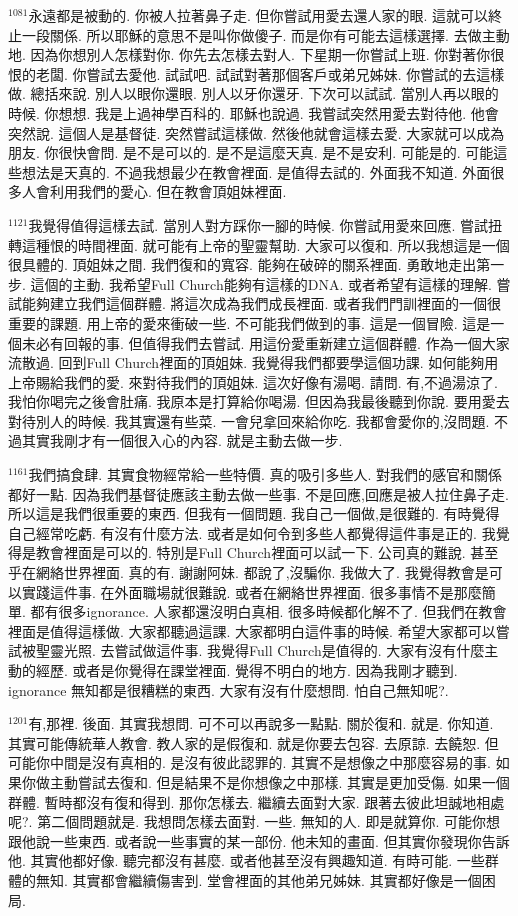 \documentclass{book}
\begin{document}
$^{1081}$永遠都是被動的.
你被人拉著鼻子走.
但你嘗試用愛去還人家的眼.
這就可以終止一段關係.
所以耶穌的意思不是叫你做傻子.
而是你有可能去這樣選擇.
去做主動地.
因為你想別人怎樣對你.
你先去怎樣去對人.
下星期一你嘗試上班.
你對著你很恨的老闆.
你嘗試去愛他.
試試吧.
試試對著那個客戶或弟兄姊妹.
你嘗試的去這樣做.
總括來說.
別人以眼你還眼.
別人以牙你還牙.
下次可以試試.
當別人再以眼的時候.
你想想.
我是上過神學百科的.
耶穌也說過.
我嘗試突然用愛去對待他.
他會突然說.
這個人是基督徒.
突然嘗試這樣做.
然後他就會這樣去愛.
大家就可以成為朋友.
你很快會問.
是不是可以的.
是不是這麼天真.
是不是安利.
可能是的.
可能這些想法是天真的.
不過我想最少在教會裡面.
是值得去試的.
外面我不知道.
外面很多人會利用我們的愛心.
但在教會頂姐妹裡面.

$^{1121}$我覺得值得這樣去試.
當別人對方踩你一腳的時候.
你嘗試用愛來回應.
嘗試扭轉這種恨的時間裡面.
就可能有上帝的聖靈幫助.
大家可以復和.
所以我想這是一個很具體的.
頂姐妹之間.
我們復和的寬容.
能夠在破碎的關系裡面.
勇敢地走出第一步.
這個的主動.
我希望Full Church能夠有這樣的DNA.
或者希望有這樣的理解.
嘗試能夠建立我們這個群體.
將這次成為我們成長裡面.
或者我們門訓裡面的一個很重要的課題.
用上帝的愛來衝破一些.
不可能我們做到的事.
這是一個冒險.
這是一個未必有回報的事.
但值得我們去嘗試.
用這份愛重新建立這個群體.
作為一個大家流散過.
回到Full Church裡面的頂姐妹.
我覺得我們都要學這個功課.
如何能夠用上帝賜給我們的愛.
來對待我們的頂姐妹.
這次好像有湯喝.
請問.
有,不過湯涼了.
我怕你喝完之後會肚痛.
我原本是打算給你喝湯.
但因為我最後聽到你說.
要用愛去對待別人的時候.
我其實還有些菜.
一會兒拿回來給你吃.
我都會愛你的,沒問題.
不過其實我剛才有一個很入心的內容.
就是主動去做一步.

$^{1161}$我們搞食肆.
其實食物經常給一些特價.
真的吸引多些人.
對我們的感官和關係都好一點.
因為我們基督徒應該主動去做一些事.
不是回應,回應是被人拉住鼻子走.
所以這是我們很重要的東西.
但我有一個問題.
我自己一個做,是很難的.
有時覺得自己經常吃虧.
有沒有什麼方法.
或者是如何令到多些人都覺得這件事是正的.
我覺得是教會裡面是可以的.
特別是Full Church裡面可以試一下.
公司真的難說.
甚至乎在網絡世界裡面.
真的有.
謝謝阿妹.
都說了,沒騙你.
我做大了.
我覺得教會是可以實踐這件事.
在外面職場就很難說.
或者在網絡世界裡面.
很多事情不是那麼簡單.
都有很多ignorance.
人家都還沒明白真相.
很多時候都化解不了.
但我們在教會裡面是值得這樣做.
大家都聽過這課.
大家都明白這件事的時候.
希望大家都可以嘗試被聖靈光照.
去嘗試做這件事.
我覺得Full Church是值得的.
大家有沒有什麼主動的經歷.
或者是你覺得在課堂裡面.
覺得不明白的地方.
因為我剛才聽到.
ignorance 無知都是很糟糕的東西.
大家有沒有什麼想問.
怕自己無知呢?.

$^{1201}$有,那裡.
後面.
其實我想問.
可不可以再說多一點點.
關於復和.
就是.
你知道.
其實可能傳統華人教會.
教人家的是假復和.
就是你要去包容.
去原諒.
去饒恕.
但可能你中間是沒有真相的.
是沒有彼此認罪的.
其實不是想像之中那麼容易的事.
如果你做主動嘗試去復和.
但是結果不是你想像之中那樣.
其實是更加受傷.
如果一個群體.
暫時都沒有復和得到.
那你怎樣去.
繼續去面對大家.
跟著去彼此坦誠地相處呢?.
第二個問題就是.
我想問怎樣去面對.
一些.
無知的人.
即是就算你.
可能你想跟他說一些東西.
或者說一些事實的某一部份.
他未知的畫面.
但其實你發現你告訴他.
其實他都好像.
聽完都沒有甚麼.
或者他甚至沒有興趣知道.
有時可能.
一些群體的無知.
其實都會繼續傷害到.
堂會裡面的其他弟兄姊妹.
其實都好像是一個困局.
\end{document}
